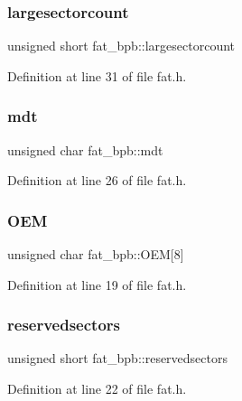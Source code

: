 \subsubsection{\texorpdfstring{largesectorcount}{largesectorcount}}
{\footnotesize\ttfamily unsigned short fat\+\_\+bpb\+::largesectorcount}



Definition at line 31 of file fat.\+h.

\mbox{\label{a00053_a238908353debb66f7bf5e1da634a394b_a238908353debb66f7bf5e1da634a394b}} 
\subsubsection{\texorpdfstring{mdt}{mdt}}
{\footnotesize\ttfamily unsigned char fat\+\_\+bpb\+::mdt}



Definition at line 26 of file fat.\+h.

\mbox{\label{a00053_a1ea9743362295df1f3354a68fb30db97_a1ea9743362295df1f3354a68fb30db97}} 
\subsubsection{\texorpdfstring{O\+EM}{OEM}}
{\footnotesize\ttfamily unsigned char fat\+\_\+bpb\+::\+O\+EM\mbox{[}8\mbox{]}}



Definition at line 19 of file fat.\+h.

\mbox{\label{a00053_ab9240f9a3403f33a95ccf401d5352262_ab9240f9a3403f33a95ccf401d5352262}} 
\subsubsection{\texorpdfstring{reservedsectors}{reservedsectors}}
{\footnotesize\ttfamily unsigned short fat\+\_\+bpb\+::reservedsectors}



Definition at line 22 of file fat.\+h.

